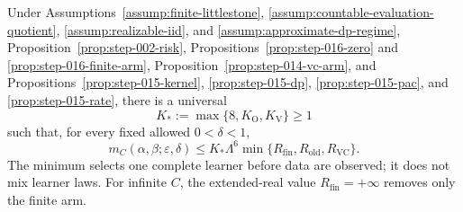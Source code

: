 \begin{proposition}\label{prop:step-016-minimum}
Under Assumptions~\ref{assump:finite-littlestone},
\ref{assump:countable-evaluation-quotient},
\ref{assump:realizable-iid}, and
\ref{assump:approximate-dp-regime},
Proposition~\ref{prop:step-002-risk},
Propositions~\ref{prop:step-016-zero} and
\ref{prop:step-016-finite-arm}, Proposition~\ref{prop:step-014-vc-arm}, and 
Propositions~\ref{prop:step-015-kernel},
\ref{prop:step-015-dp}, \ref{prop:step-015-pac}, and
\ref{prop:step-015-rate}, there is a universal
\[
K_*:=\max\{8,K_{\mathrm O},K_{\mathrm V}\}\ge1
\tag{6.1}
\]
such that, for every fixed allowed \(0<\delta<1\),
\[
m_C(\alpha,\beta;\varepsilon,\delta)
\le K_*\Lambda^6
\min\{R_{\mathrm{fin}},R_{\mathrm{old}},R_{\mathrm{VC}}\}.
\tag{6.2}
\]
The minimum selects one complete learner before data are observed; it does
not mix learner laws. For infinite \(C\), the extended-real value
\(R_{\mathrm{fin}}=+\infty\) removes only the finite arm.


\end{proposition}

